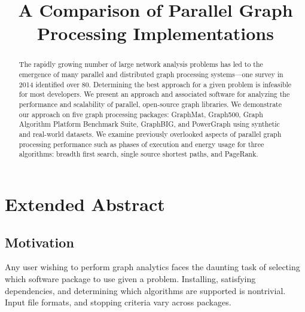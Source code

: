 \documentclass[conference]{IEEEtran}
\begin{document}
\title{A Comparison of Parallel Graph Processing Implementations}
\author{
	\and
}
\maketitle

\begin{abstract}
The rapidly growing number of large network analysis problems has led to the emergence of many parallel and distributed graph processing systems---one survey in 2014 identified over 80. Determining the best approach for a given problem is infeasible for most developers. We present an approach and associated software for analyzing the performance and scalability of parallel, open-source graph libraries. We demonstrate our approach on five graph processing packages: GraphMat, Graph500, Graph Algorithm Platform Benchmark Suite, GraphBIG, and PowerGraph using synthetic and real-world datasets. We examine previously overlooked aspects of parallel graph processing performance such as phases of execution and energy usage for three algorithms: breadth first search, single source shortest paths, and PageRank.
\end{abstract}
\section{Extended Abstract}

\subsection{Motivation}
Any user wishing to perform graph analytics faces the daunting task of selecting which software package to use given a problem. Installing, satisfying dependencies, and determining which algorithms are supported is nontrivial. Input file formats, and stopping criteria vary across packages.
\end{document}
